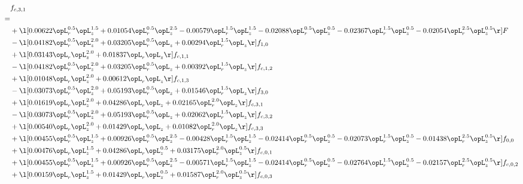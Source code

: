 \begin{alignat}{2} 
\label{eq:f_31_1} 
& f_{c,3,1} \nonumber \\ 
 = \\ 
& + \l[  0.00622 \opL_r^{0.5} \opL_z^{1.5} +  0.01054 \opL_r^{0.5} \opL_z^{2.5}   -0.00579 \opL_r^{1.5} \opL_z^{1.5}   -0.02088 \opL_r^{0.5} \opL_z^{0.5}   -0.02367 \opL_r^{1.5} \opL_z^{0.5}   -0.02054 \opL_r^{2.5} \opL_z^{0.5}  \r] F \nonumber \\ 
& - \l[  0.04182 \opL_r^{0.5} \opL_z^{2.0} +  0.03205 \opL_r^{0.5} \opL_z +  0.00294 \opL_r^{1.5} \opL_z  \r] f_{1,0} \nonumber \\ 
& + \l[  0.03143 \opL_r \opL_z^{2.0} +  0.01837 \opL_r \opL_z  \r] f_{c,1,1} \nonumber \\ 
& - \l[  0.04182 \opL_r^{0.5} \opL_z^{2.0} +  0.03205 \opL_r^{0.5} \opL_z +  0.00392 \opL_r^{1.5} \opL_z  \r] f_{c,1,2} \nonumber \\ 
& + \l[  0.01048 \opL_r \opL_z^{2.0} +  0.00612 \opL_r \opL_z  \r] f_{c,1,3} \nonumber \\ 
& - \l[  0.03073 \opL_r^{0.5} \opL_z^{2.0} +  0.05193 \opL_r^{0.5} \opL_z +  0.01546 \opL_r^{1.5} \opL_z  \r] f_{3,0} \nonumber \\ 
& + \l[  0.01619 \opL_r \opL_z^{2.0} +  0.04286 \opL_r \opL_z +  0.02165 \opL_r^{2.0} \opL_z  \r] f_{c,3,1} \nonumber \\ 
& - \l[  0.03073 \opL_r^{0.5} \opL_z^{2.0} +  0.05193 \opL_r^{0.5} \opL_z +  0.02062 \opL_r^{1.5} \opL_z  \r] f_{c,3,2} \nonumber \\ 
& + \l[  0.00540 \opL_r \opL_z^{2.0} +  0.01429 \opL_r \opL_z +  0.01082 \opL_r^{2.0} \opL_z  \r] f_{c,3,3} \nonumber \\ 
& + \l[  0.00455 \opL_r^{0.5} \opL_z^{1.5} +  0.00926 \opL_r^{0.5} \opL_z^{2.5}   -0.00428 \opL_r^{1.5} \opL_z^{1.5}   -0.02414 \opL_r^{0.5} \opL_z^{0.5}   -0.02073 \opL_r^{1.5} \opL_z^{0.5}   -0.01438 \opL_r^{2.5} \opL_z^{0.5}  \r] f_{0,0} \nonumber \\ 
& + \l[  0.00476 \opL_r \opL_z^{1.5} +  0.04286 \opL_r \opL_z^{0.5} +  0.03175 \opL_r^{2.0} \opL_z^{0.5}  \r] f_{c,0,1} \nonumber \\ 
& + \l[  0.00455 \opL_r^{0.5} \opL_z^{1.5} +  0.00926 \opL_r^{0.5} \opL_z^{2.5}   -0.00571 \opL_r^{1.5} \opL_z^{1.5}   -0.02414 \opL_r^{0.5} \opL_z^{0.5}   -0.02764 \opL_r^{1.5} \opL_z^{0.5}   -0.02157 \opL_r^{2.5} \opL_z^{0.5}  \r] f_{c,0,2} \nonumber \\ 
& + \l[  0.00159 \opL_r \opL_z^{1.5} +  0.01429 \opL_r \opL_z^{0.5} +  0.01587 \opL_r^{2.0} \opL_z^{0.5}  \r] f_{c,0,3} \nonumber \\ 

\end{alignat}
